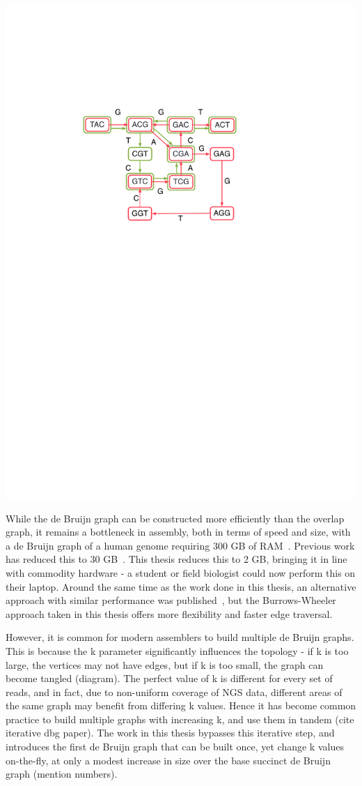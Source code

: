 \includegraphics*[width=100ex]{images/cdbg.pdf}

While the de Bruijn graph can be constructed more efficiently than the overlap graph, it remains a bottleneck in assembly, both in terms of speed and size, with a de Bruijn graph of a human genome requiring 300 GB of RAM~\cite{Simpson:2009}. Previous work has reduced this to 30 GB~\cite{Conway}. This thesis reduces this to 2 GB, bringing it in line with commodity hardware - a student or field biologist could now perform this on their laptop. Around the same time as the work done in this thesis, an alternative approach with similar performance was published~\cite{wabi}, but the Burrows-Wheeler approach taken in this thesis offers more flexibility and faster edge traversal.

However, it is common for modern assemblers to build multiple de Bruijn graphs. This is because the k parameter significantly influences the topology - if k is too large, the vertices may not have edges, but if k is too small, the graph can become tangled (diagram). The perfect value of k is different for every set of reads, and in fact, due to non-uniform coverage of NGS data, different areas of the same graph may benefit from differing k values. Hence it has become common practice to build multiple graphs with increasing k, and use them in tandem (cite iterative dbg paper). The work in this thesis bypasses this iterative step, and introduces the first de Bruijn graph that can be built once, yet change k values on-the-fly, at only a modest increase in size over the base succinct de Bruijn graph (mention numbers).

